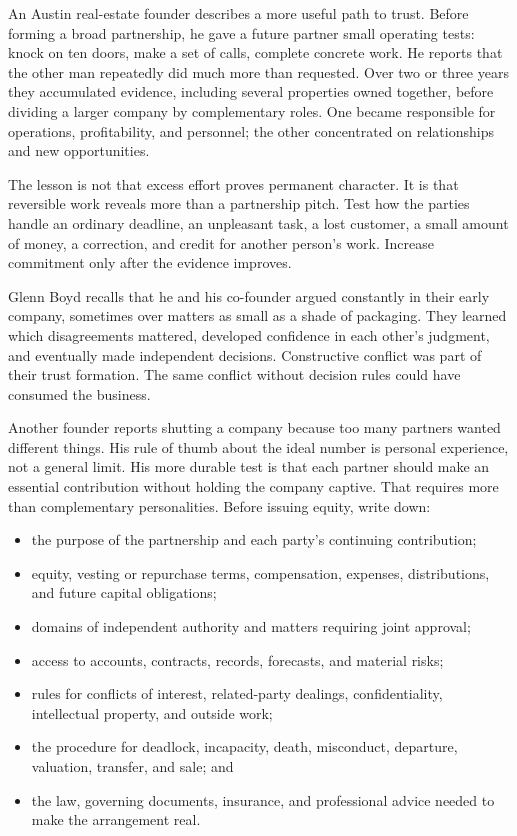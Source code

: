 An Austin real-estate founder describes a more useful path to trust. Before
forming a broad partnership, he gave a future partner small operating tests:
knock on ten doors, make a set of calls, complete concrete work. He reports
that the other man repeatedly did much more than requested. Over two or three
years they accumulated evidence, including several properties owned together,
before dividing a larger company by complementary roles. One became responsible
for operations, profitability, and personnel; the other concentrated on
relationships and new opportunities.

The lesson is not that excess effort proves permanent character. It is that
reversible work reveals more than a partnership pitch. Test how the parties
handle an ordinary deadline, an unpleasant task, a lost customer, a small
amount of money, a correction, and credit for another person's work. Increase
commitment only after the evidence improves.

Glenn Boyd recalls that he and his co-founder argued constantly in their early
company, sometimes over matters as small as a shade of packaging. They learned
which disagreements mattered, developed confidence in each other's judgment,
and eventually made independent decisions. Constructive conflict was part of
their trust formation. The same conflict without decision rules could have
consumed the business.

Another founder reports shutting a company because too many partners wanted
different things. His rule of thumb about the ideal number is personal
experience, not a general limit. His more durable test is that each partner
should make an essential contribution without holding the company captive.
That requires more than complementary personalities. Before issuing equity,
write down:

\begin{itemize}[leftmargin=1.5em,itemsep=0.14em]
\item the purpose of the partnership and each party's continuing contribution;
\item equity, vesting or repurchase terms, compensation, expenses, distributions,
  and future capital obligations;
\item domains of independent authority and matters requiring joint approval;
\item access to accounts, contracts, records, forecasts, and material risks;
\item rules for conflicts of interest, related-party dealings, confidentiality,
  intellectual property, and outside work;
\item the procedure for deadlock, incapacity, death, misconduct, departure,
  valuation, transfer, and sale; and
\item the law, governing documents, insurance, and professional advice needed
  to make the arrangement real.
\end{itemize}

